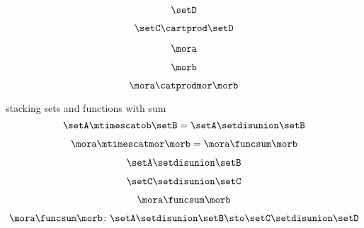 {\begin{forslides}
        \begin{equation}
            \label{eq:parallelism-009}
            \setD
        \end{equation}

        \begin{equation}
            \label{eq:parallelism-010}
            \setC \cartprod \setD
        \end{equation}

        \begin{equation}
            \label{eq:parallelism-011}
            \mora
        \end{equation}

        \begin{equation}
            \label{eq:parallelism-012}
            \morb
        \end{equation}

        \begin{equation}
            \label{eq:parallelism-012b}
            \mora \catprodmor \morb
        \end{equation}

        stacking sets and functions with sum
        \begin{equation}
            \label{eq:parallelism-013}
            \setA \mtimescatob \setB = \setA \setdisunion \setB
        \end{equation}

        \begin{equation}
            \label{eq:parallelism-014}
            \mora \mtimescatmor \morb = \mora \funcsum \morb
        \end{equation}

        \begin{equation}
            \label{eq:parallelism-015}
            \setA \setdisunion \setB
        \end{equation}

        \begin{equation}
            \label{eq:parallelism-016}
            \setC \setdisunion \setC
        \end{equation}

        \begin{equation}
            \label{eq:parallelism-017}
            \mora \funcsum \morb
        \end{equation}

        \begin{equation}
            \label{eq:parallelism-018}
            \mora \funcsum \morb \colon \setA \setdisunion \setB \sto \setC \setdisunion \setD
        \end{equation}


\end{forslides}}
